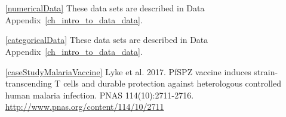 





\section{}
\label{ch_summarizing_data_data}

\begin{itemize}
\item[\ref{numericalData}]
    These data sets are described in
    Data Appendix~\ref{ch_intro_to_data_data}.

\item[\ref{categoricalData}]
    These data sets are described in
    Data Appendix~\ref{ch_intro_to_data_data}.

\item[\ref{caseStudyMalariaVaccine}]
    Lyke et al. 2017.
    PfSPZ vaccine induces strain-transcending T cells
    and durable protection against heterologous controlled
    human malaria infection.
    PNAS 114(10):2711-2716.
    \url{http://www.pnas.org/content/114/10/2711}
\end{itemize}









\section{}
\label{ch_probability_data}

